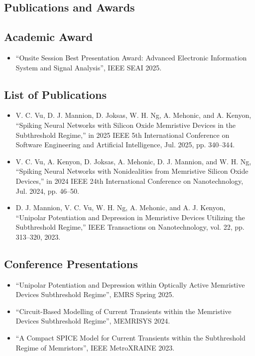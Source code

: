 \begin{impact}
\section*{\centering Publications and Awards}

\subsection*{Academic Award}
\begin{itemize}
    \item ``Onsite Session Best Presentation Award: Advanced Electronic Information System and Signal Analysis'', IEEE SEAI 2025.
\end{itemize}

\subsection*{List of Publications}
\begin{itemize}
    \item V. C. Vu, D. J. Mannion, D. Joksas, W. H. Ng, A. Mehonic, and A. Kenyon, ``Spiking Neural Networks with Silicon Oxide Memristive Devices in the Subthreshold Regime,'' in 2025 IEEE 5th International Conference on Software Engineering and Artificial Intelligence, Jul. 2025, pp. 340--344.
    \item V. C. Vu, A. Kenyon, D. Joksas, A. Mehonic, D. J. Mannion, and W. H. Ng, ``Spiking Neural Networks with Nonidealities from Memristive Silicon Oxide Devices,'' in 2024 IEEE 24th International Conference on Nanotechnology, Jul. 2024, pp. 46--50.
    \item D. J. Mannion, V. C. Vu, W. H. Ng, A. Mehonic, and A. J. Kenyon, ``Unipolar Potentiation and Depression in Memristive Devices Utilizing the Subthreshold Regime,'' IEEE Transactions on Nanotechnology, vol. 22, pp. 313--320, 2023.
\end{itemize}

\subsection*{Conference Presentations}
\begin{itemize}
    \item ``Unipolar Potentiation and Depression within Optically Active Memristive Devices Subthreshold Regime'', EMRS Spring 2025.
    \item ``Circuit-Based Modelling of Current Transients within the Memristive Devices Subthreshold Regime'', MEMRISYS 2024.
    \item ``A Compact SPICE Model for Current Transients within the Subthreshold Regime of Memristors'', IEEE MetroXRAINE 2023.
\end{itemize}

\end{impact}
